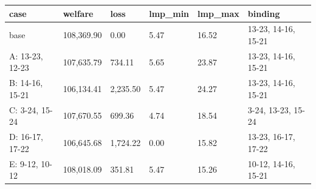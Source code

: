 \begin{tabular}{llllll}
\toprule
case & welfare & loss & lmp\_min & lmp\_max & binding \\
\midrule
base & 108,369.90 & 0.00 & 5.47 & 16.52 & 13-23, 14-16, 15-21 \\
A: 13-23, 12-23 & 107,635.79 & 734.11 & 5.65 & 23.87 & 13-23, 14-16, 15-21 \\
B: 14-16, 15-21 & 106,134.41 & 2,235.50 & 5.47 & 24.27 & 13-23, 14-16, 15-21 \\
C: 3-24, 15-24 & 107,670.55 & 699.36 & 4.74 & 18.54 & 3-24, 13-23, 15-24 \\
D: 16-17, 17-22 & 106,645.68 & 1,724.22 & 0.00 & 15.82 & 13-23, 16-17, 17-22 \\
E: 9-12, 10-12 & 108,018.09 & 351.81 & 5.47 & 15.26 & 10-12, 14-16, 15-21 \\
\bottomrule
\end{tabular}
